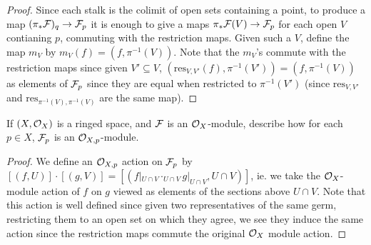 \begin{proof}
    Since each stalk is the colimit of open sets containing a point, to produce a map $(\pi_*\mathcal{F})_q \to \mathcal{F}_p$ it is enough to give a maps $\pi_*\mathcal{F}(V) \to \mathcal{F}_p$ for each open $V$ contianing $p$, commuting with the restriction maps. Given such a $V$, define the map $m_V$ by $m_V(f) = (f, \pi^{-1}(V))$. Note that the $m_V$'s commute with the restriction maps since given $V' \subseteq V$, $(\text{res}_{V, V'}(f), \pi^{-1}(V')) = (f, \pi^{-1}(V))$ as elements of $\mathcal{F}_p$ since they are equal when restricted to $\pi^{-1}(V')$ (since $\text{res}_{V, V'}$ and $\text{res}_{\pi^{-1}(V), \pi^{-1}(V)}$ are the same map). 
\end{proof}

\begin{exercise}
    If $(X, \mathcal{O}_X)$ is a ringed space, and $\mathcal{F}$ is an $\mathcal{O}_X$-module, describe how for each $p \in X$, $\mathcal{F}_p$ is an $\mathcal{O}_{X, p}$-module. 
\end{exercise}

\begin{proof}
    We define an $\mathcal{O}_{X, p}$ action on $\mathcal{F}_p$ by $[(f, U)] \cdot [(g, V)] = [(f|_{U \cap V} \cdot_{U \cap V} g|_{U \cap V}, U \cap V)]$, ie. we take the $\mathcal{O}_X$-module action of $f$ on $g$ viewed as elements of the sections above $U \cap V$. Note that this action is well defined since given two representatives of the same germ, restricting them to an open set on which they agree, we see they induce the same action since the restriction maps commute the original $\mathcal{O}_X$ module action. 
\end{proof}